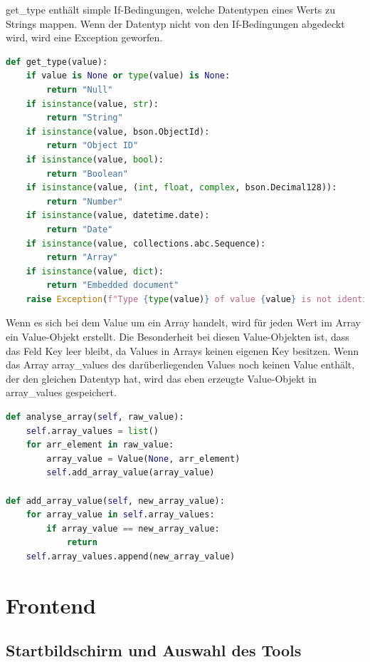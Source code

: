 get\_type enthält simple If-Bedingungen, welche Datentypen eines Werts zu Strings mappen.
Wenn der Datentyp nicht von den If-Bedingungen abgedeckt wird, wird eine Exception geworfen.

\begin{lstlisting}[language=python, caption={Value.get\_type},label={lst:backend_value_get_type}]
def get_type(value):
    if value is None or type(value) is None:
        return "Null"
    if isinstance(value, str):
        return "String"
    if isinstance(value, bson.ObjectId):
        return "Object ID"
    if isinstance(value, bool):
        return "Boolean"
    if isinstance(value, (int, float, complex, bson.Decimal128)):
        return "Number"
    if isinstance(value, datetime.date):
        return "Date"
    if isinstance(value, collections.abc.Sequence):
        return "Array"
    if isinstance(value, dict):
        return "Embedded document"
    raise Exception(f"Type {type(value)} of value {value} is not identifiable!")
\end{lstlisting}

Wenn es sich bei dem Value um ein Array handelt, wird für jeden Wert im Array ein Value-Objekt erstellt.
Die Besonderheit bei diesen Value-Objekten ist, dass das Feld Key leer bleibt, da Values in Arrays keinen eigenen Key besitzen.
Wenn das Array array\_values des darüberliegenden Values noch keinen Value enthält, der den gleichen Datentyp hat, wird das eben erzeugte Value-Objekt in array\_values gespeichert.

\begin{lstlisting}[language=python, caption={Value.analyse\_array},label={lst:backend_value_analyse_array}]
def analyse_array(self, raw_value):
    self.array_values = list()
    for arr_element in raw_value:
        array_value = Value(None, arr_element)
        self.add_array_value(array_value)

def add_array_value(self, new_array_value):
    for array_value in self.array_values:
        if array_value == new_array_value:
            return
    self.array_values.append(new_array_value)
\end{lstlisting}

\section{Frontend}
\label{sec:frontend}

\subsection{Startbildschirm und Auswahl des Tools}
\label{sub:fe_startbildschirm}

